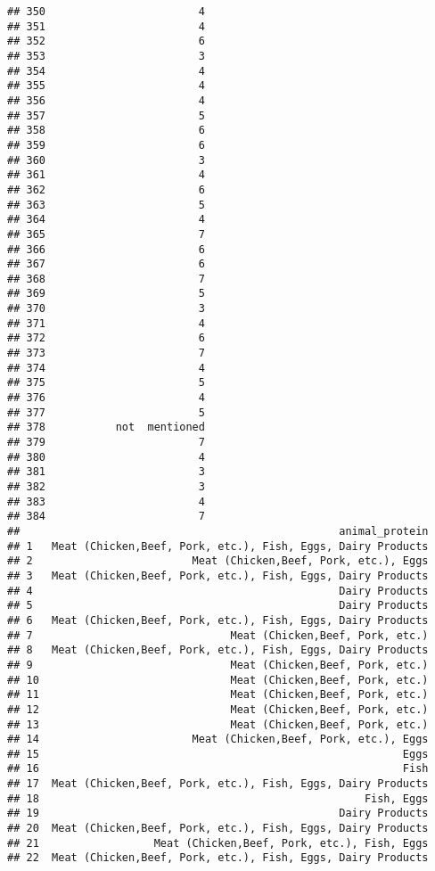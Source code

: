 \documentclass[
]{article}
\begin{document}
\begin{verbatim}
## 350                        4
## 351                        4
## 352                        6
## 353                        3
## 354                        4
## 355                        4
## 356                        4
## 357                        5
## 358                        6
## 359                        6
## 360                        3
## 361                        4
## 362                        6
## 363                        5
## 364                        4
## 365                        7
## 366                        6
## 367                        6
## 368                        7
## 369                        5
## 370                        3
## 371                        4
## 372                        6
## 373                        7
## 374                        4
## 375                        5
## 376                        4
## 377                        5
## 378           not  mentioned
## 379                        7
## 380                        4
## 381                        3
## 382                        3
## 383                        4
## 384                        7
##                                                  animal_protein
## 1   Meat (Chicken,Beef, Pork, etc.), Fish, Eggs, Dairy Products
## 2                         Meat (Chicken,Beef, Pork, etc.), Eggs
## 3   Meat (Chicken,Beef, Pork, etc.), Fish, Eggs, Dairy Products
## 4                                                Dairy Products
## 5                                                Dairy Products
## 6   Meat (Chicken,Beef, Pork, etc.), Fish, Eggs, Dairy Products
## 7                               Meat (Chicken,Beef, Pork, etc.)
## 8   Meat (Chicken,Beef, Pork, etc.), Fish, Eggs, Dairy Products
## 9                               Meat (Chicken,Beef, Pork, etc.)
## 10                              Meat (Chicken,Beef, Pork, etc.)
## 11                              Meat (Chicken,Beef, Pork, etc.)
## 12                              Meat (Chicken,Beef, Pork, etc.)
## 13                              Meat (Chicken,Beef, Pork, etc.)
## 14                        Meat (Chicken,Beef, Pork, etc.), Eggs
## 15                                                         Eggs
## 16                                                         Fish
## 17  Meat (Chicken,Beef, Pork, etc.), Fish, Eggs, Dairy Products
## 18                                                   Fish, Eggs
## 19                                               Dairy Products
## 20  Meat (Chicken,Beef, Pork, etc.), Fish, Eggs, Dairy Products
## 21                  Meat (Chicken,Beef, Pork, etc.), Fish, Eggs
## 22  Meat (Chicken,Beef, Pork, etc.), Fish, Eggs, Dairy Products

\end{verbatim}
\end{document}
